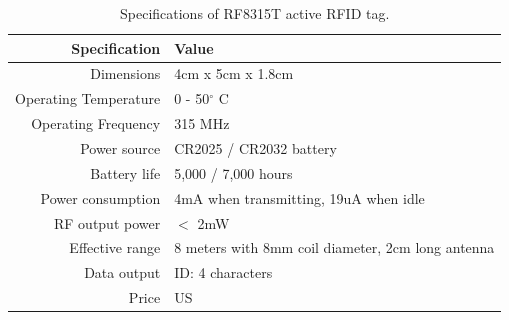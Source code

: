 \documentclass[a4paper,11pt]{scrartcl}
\begin{document}
\begin{table}[H]
	\centering
	\begin{tabular}{ | r || l | }
		\hline
		\textbf{Specification}	& \textbf{Value} \\ \hline
		Dimensions				& 4cm x 5cm x 1.8cm \\ \hline
		Operating Temperature	& 0 - 50$^\circ$ C	\\ \hline
		Operating Frequency		& 315 MHz	\\ \hline
		Power source			& CR2025 / CR2032 battery \\ \hline
		Battery life			& 5,000 / 7,000 hours \\ \hline
		Power consumption		& 4mA when transmitting, 19uA when idle \\ \hline
		RF output power			& $<$ 2mW \\ \hline
		Effective range			& 8 meters with 8mm coil diameter, 2cm long antenna \\ \hline
		Data output				& ID: 4 characters \\ \hline
		Price					& US \textdollar 19.95 \\ \hline
	\end{tabular}
	\caption{Specifications of RF8315T active RFID tag.}
\end{table}
\end{document}
